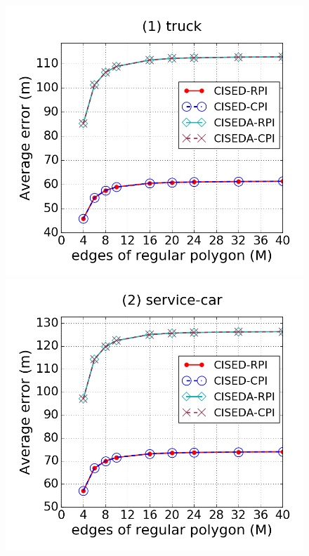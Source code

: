 \begin{figure}[tb!]
\centering
\includegraphics[scale = 0.245]{figures/Exp-M-e-200-error-truck.png}
\includegraphics[scale = 0.245]{figures/Exp-M-e-200-error-service.png}

\end{figure}
